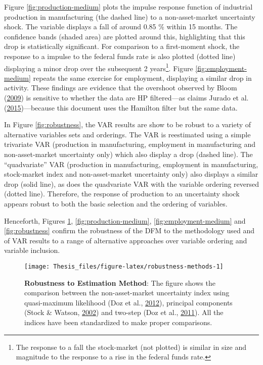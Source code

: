 \documentclass[12pt,twoside]{reedthesis}
\begin{document}
Figure \ref{fig:production-medium} plots the impulse response function of industrial production in manufacturing (the dashed line) to a non-asset-market uncertainty shock. The variable displays a fall of around 0.85 \% within 15 months. The confidence bands (shaded area) are plotted around this, highlighting that this drop is statistically significant. For comparison to a first-moment shock, the response to a impulse to the federal funds rate is also plotted (dotted line) displaying a minor drop over the subsequent 2 years\footnote{The response to a fall the stock-market (not plotted) is similar in size and magnitude to the response to a rise in the federal funds rate.}. Figure \ref{fig:employment-medium} repeats the same exercise for employment, displaying a similar drop in activity. These findings are evidence that the overshoot observed by Bloom (\protect\hyperlink{ref-bloom:2009}{2009}) is sensitive to whether the data are HP filtered---as claims Jurado et al. (\protect\hyperlink{ref-juraludvng:2015}{2015})---because this document uses the Hamilton filter but the same data.

In Figure \ref{fig:robustness}, the VAR results are show to be robust to a variety of alternative variables sets and orderings. The VAR is reestimated using a simple trivariate VAR (production in manufacturing, employment in manufacturing and non-asset-market uncertainty only) which also display a drop (dashed line). The ``quadvariate'' VAR (production in manufacturing, employment in manufacturing, stock-market index and non-asset-market uncertainty only) also displays a similar drop (solid line), as does the quadvariate VAR with the variable ordering reversed (dotted line). Therefore, the response of production to an uncertainty shock appears robust to both the basic selection and the ordering of variables.

Henceforth, Figures \ref{fig:robustness-methods}, \ref{fig:production-medium}, \ref{fig:employment-medium} and \ref{fig:robustness} confirm the robustness of the DFM to the methodology used and of VAR results to a range of alternative approaches over variable ordering and variable inclusion.


\begin{figure}

{\centering \texttt{[image: Thesis\_files/figure-latex/robustness-methods-1]} 

}

\caption[Robustness to Estimation Method]{\textbf{Robustness to Estimation Method}: The figure shows the comparison between the non-asset-market uncertainty index using quasi-maximum likelihood (Doz et al., \protect\hyperlink{ref-dozgianreic:2012}{2012}), principal components (Stock \& Watson, \protect\hyperlink{ref-stocwats:2002}{2002}) and two-step (Doz et al., \protect\hyperlink{ref-dozgianreic:2011}{2011}). All the indices have been standardized to make proper comparisons.}\label{fig:robustness-methods}
\end{figure}
\end{document}

